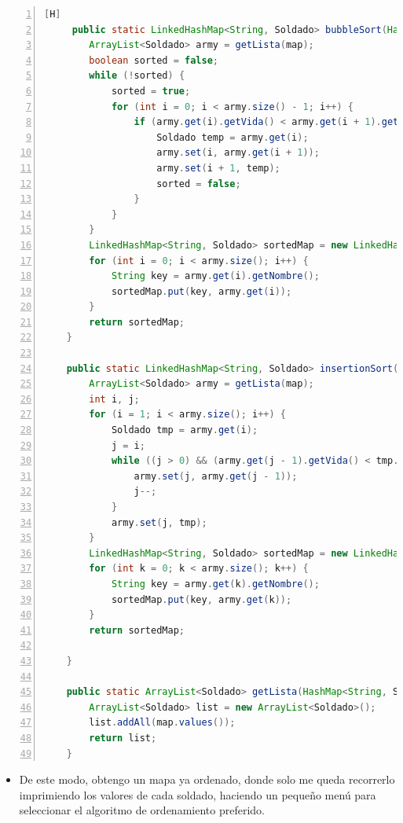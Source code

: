 \documentclass{article}
\begin{document}
	\begin{lstlisting}[language=java,caption={Algoritmos de ordenamiento}, numbers=left][H]
	 public static LinkedHashMap<String, Soldado> bubbleSort(HashMap<String, Soldado> map, int ej) {
        ArrayList<Soldado> army = getLista(map);
        boolean sorted = false;
        while (!sorted) {
            sorted = true;
            for (int i = 0; i < army.size() - 1; i++) {
                if (army.get(i).getVida() < army.get(i + 1).getVida()) {
                    Soldado temp = army.get(i);
                    army.set(i, army.get(i + 1));
                    army.set(i + 1, temp);
                    sorted = false;
                }
            }
        }
        LinkedHashMap<String, Soldado> sortedMap = new LinkedHashMap<>();
        for (int i = 0; i < army.size(); i++) {
            String key = army.get(i).getNombre();
            sortedMap.put(key, army.get(i));
        }
        return sortedMap;
    }

    public static LinkedHashMap<String, Soldado> insertionSort(HashMap<String, Soldado> map, int ej) {
        ArrayList<Soldado> army = getLista(map);
        int i, j;
        for (i = 1; i < army.size(); i++) {
            Soldado tmp = army.get(i);
            j = i;
            while ((j > 0) && (army.get(j - 1).getVida() < tmp.getVida())) {
                army.set(j, army.get(j - 1));
                j--;
            }
            army.set(j, tmp);
        }
        LinkedHashMap<String, Soldado> sortedMap = new LinkedHashMap<>();
        for (int k = 0; k < army.size(); k++) {
            String key = army.get(k).getNombre();
            sortedMap.put(key, army.get(k));
        }
        return sortedMap;

    }

    public static ArrayList<Soldado> getLista(HashMap<String, Soldado> map) {
        ArrayList<Soldado> list = new ArrayList<Soldado>();
        list.addAll(map.values());
        return list;
    }
	\end{lstlisting}
	\begin{itemize}	
		\item De este modo, obtengo un mapa ya ordenado, donde solo me queda recorrerlo imprimiendo los valores de cada soldado, haciendo un pequeño menú para seleccionar el algoritmo de ordenamiento preferido.
	\end{itemize}
\end{document}
